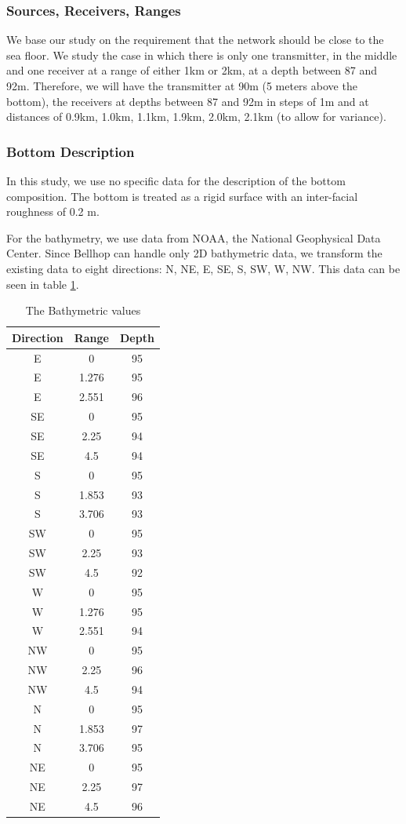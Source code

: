 \documentclass[a4paper]{IEEEtran}
\begin{document}
\subsubsection{Sources, Receivers, Ranges}
We base our study on the requirement that the network should be close
to the sea floor. We study the case in which there is only one
transmitter, in the middle and one receiver at a range of either 1km or
2km, at a depth between 87 and 92m. Therefore, we will have the
transmitter at 90m (5 meters above the bottom), the receivers at
depths between 87 and 92m in steps of 1m and at distances of 0.9km,
1.0km, 1.1km, 1.9km, 2.0km, 2.1km (to allow for variance).

\subsubsection{Bottom Description}
In this study, we use no specific data for the description of the
bottom composition. The bottom is treated as a rigid surface with an
inter-facial roughness of 0.2 m.

For the bathymetry, we use data from NOAA, the National Geophysical
Data Center. Since Bellhop can handle only 2D bathymetric data, we
transform the existing data to eight directions: N, NE, E, SE, S, SW,
W, NW. This data can be seen in table \ref{table:bty}.
\begin{table}
  \centering
  \begin{tabular}{|c|c|c|}
    \hline
    Direction & Range & Depth \\\hline
    E & 0 & 95 \\\hline
    E & 1.276 & 95 \\\hline
    E & 2.551 & 96 \\\hline
    SE & 0 & 95 \\\hline
    SE & 2.25 & 94\\\hline
    SE & 4.5 & 94 \\\hline
    S & 0 & 95 \\\hline
    S & 1.853 & 93\\\hline
    S & 3.706 & 93\\\hline
    SW & 0 & 95\\\hline
    SW & 2.25 &93 \\\hline
    SW & 4.5 &92\\\hline
    W & 0 & 95\\\hline
    W & 1.276 & 95 \\\hline
    W & 2.551 & 94 \\\hline
    NW & 0 & 95 \\\hline
    NW & 2.25 & 96 \\\hline
    NW & 4.5 & 94 \\\hline
    N & 0 & 95 \\\hline
    N & 1.853 & 97\\\hline
    N & 3.706 &95\\\hline
    NE & 0&95 \\\hline
    NE & 2.25& 97\\\hline
    NE & 4.5& 96\\\hline
  \end{tabular}
  \caption{\small{The Bathymetric values}}
  \label{table:bty}
\end{table}
\end{document}
